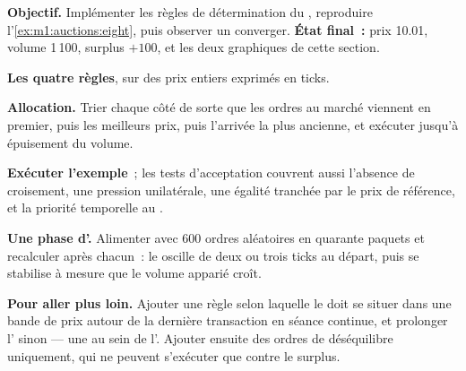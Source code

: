 \begin{tutorial}
\textbf{Objectif.} Implémenter les règles de détermination du , reproduire
l'\cref{ex:m1:auctions:eight}, puis observer un  converger.
\textbf{État final~:} prix 10.01, volume 1\,100, surplus $+100$, et les deux
graphiques de cette section.
\begin{tutsteps}
\item \textbf{Les quatre règles}, sur des prix entiers exprimés en ticks.
\label{lst:m1:auctions:uncross}
\item \textbf{Allocation.} Trier chaque côté de sorte que les ordres au marché viennent en premier,
puis les meilleurs prix, puis l'arrivée la plus ancienne, et exécuter jusqu'à épuisement
du volume.
\label{lst:m1:auctions:allocate}
\item \textbf{Exécuter l'exemple}~; les tests d'acceptation couvrent aussi l'absence
de croisement, une pression unilatérale, une égalité tranchée par le prix de référence, et
la priorité temporelle au .
\item \textbf{Une phase d'.} Alimenter avec 600 ordres aléatoires en quarante paquets et
recalculer après chacun~: le  oscille de deux ou trois ticks au
départ, puis se stabilise à mesure que le volume apparié croît.
\end{tutsteps}
\textbf{Pour aller plus loin.} Ajouter une règle selon laquelle le  doit se situer
dans une bande de prix autour de la dernière transaction en séance continue, et prolonger l' sinon
--- une  au sein de l'. Ajouter ensuite des ordres
de déséquilibre uniquement, qui ne peuvent s'exécuter que contre le surplus.
\end{tutorial}

